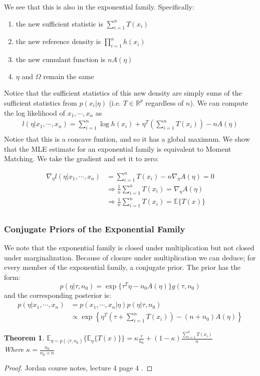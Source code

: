 \documentclass[]{article}
\theoremstyle{mattstyle}
\newtheorem{theorem}{Theorem}[section]
\theoremstyle{definition}
\begin{document}
We see that this is also in the exponential family. Specifically:
\begin{enumerate}
	\item the new sufficient statistic is $\sum_{i=1}^nT(x_i)$
	\item the new reference density is $\prod_{i=1}^n h(x_i)$
	\item the new cumulant function is $nA(\eta)$
	\item $\eta$ and $\Omega$ remain the same
\end{enumerate}

Notice that the sufficient statistics of this new density are simply sums of the sufficient statistics from $p(x_i|\eta)$ (i.e. $T \in \mathbb{R}^p$ regardless of $n$). We can compute the log likelihood of $x_1, \cdots, x_n$ as
\begin{align*}
l(\eta| x_1, \cdots, x_n) = \sum_{i=1}^n \log h(x_i) +  \eta^T\left(\sum_{i=1}^nT(x_i)\right) - nA(\eta)\\
\end{align*}
Notice that this is a concave funtion, and so it has a global maximum. We show that the MLE estimate for an exponential family is equivalent to Moment Matching. We take the gradient and set it to zero:

\begin{align*}
\nabla_{\eta} l(\eta| x_1, \cdots, x_n) &= \sum_{i=1}^nT(x_i) - n\nabla_{\eta} A(\eta) = 0\\
&\Rightarrow \frac{1}{n}\sum_{i=1}^nT(x_i) = \nabla_{\eta}A(\eta)\\
&\Rightarrow \frac{1}{n}\sum_{i=1}^nT(x_i) = \mathbb{E}\{T(x)\}\\
\end{align*} 

\subsubsection{Conjugate Priors of the Exponential Family}

We note that the exponential family is closed under multiplication but not closed under marginalization. Because of closure under multiplication we can deduce; for every member of the exponential family, a conjugate prior. The prior has the form:
$$ p(\eta | \tau, n_0) = \exp\{ \tau^T\eta - n_0A(\eta)\}g(\tau,n_0)$$  
and the corresponding posterior is:
\begin{align*}
p( \eta | x_1, \cdots, x_n) &= p(x_1, \cdots, x_n | \eta)p(\eta| \tau, n_0)\\
&\propto\exp\left\{\eta^T\left(\tau + \sum_{i=1}^nT(x_i)\right) - (n + n_0)A(\eta)\right\}
\end{align*}
\begin{theorem}
$\mathbb{E}_{\eta \sim p(\cdot| \tau, n_0)}\{\mathbb{E}_{\eta}\{ T(x)\}\} = \kappa \frac{\tau}{n_0} + (1-\kappa)\frac{\sum_{i=1}^nT(x_i)}{n}$\\
Where $\kappa = \frac{n_0}{n_0 + n}$
\end{theorem}
\begin{proof}
	Jordan course notes, lecture 4 page 4 \cite{MJordanNotes}.
\end{proof}
\newpage
\end{document}
